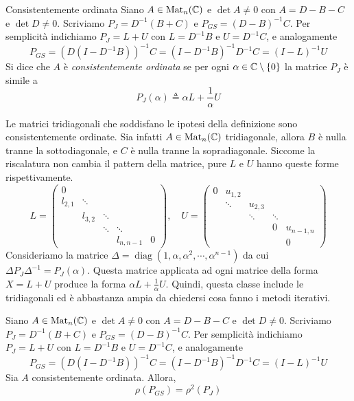 \documentclass[a4paper]{article}
\begin{document}
\begin{snippetdefinition}{Consistentemente ordinata}
    Siano \(A \in \operatorname{Mat}_n(\mathbb{C})\)
    e \(\det A \neq 0\)
    con \(A = D - B - C\) e \(\det D \neq 0\).
    Scriviamo \(P_J = D^{-1}(B + C)\)
    e \(P_{GS} = (D-B)^{-1}C\).
    Per semplicità indichiamo \(P_J = L+U\)
    con \(L = D^{-1}B\)
    e \(U = D^{-1}C\), e analogamente
    \[
        P_{GS} = (D(I-D^{-1}B))^{-1}C = (I - D^{-1} B)^{-1}D^{-1}C
        = (I-L)^{-1}U
    \]
    Si dice che \(A\) è \emph{consistentemente ordinata}
    se per ogni \(\alpha\in\mathbb{C}\setminus\{0\}\) la matrice \(P_J\)
    è simile a \[
        P_J(\alpha) \triangleq \alpha L + \frac{1}{\alpha}U
    \]
\end{snippetdefinition}

Le matrici tridiagonali che soddisfano le ipotesi della definizione sono
consistentemente ordinate. Sia infatti \(A \in \operatorname{Mat}_n(\mathbb{C})\)
tridiagonale, allora \(B\) è nulla tranne la sottodiagonale, e \(C\)
è nulla tranne la sopradiagonale. Siccome la riscalatura
non cambia il pattern della matrice, pure \(L\) e \(U\) hanno queste forme rispettivamente.
\[
    L =
    \begin{pmatrix}
        0 & & && \\
        l_{2,1} & \ddots & && \\
        & l_{3,2} & \ddots && \\
        & & \ddots & \ddots & \\
        & & & l_{n,n-1} & 0
    \end{pmatrix}, \quad
    U =
    \begin{pmatrix}
        0 & u_{1,2} & && \\
        & \ddots & u_{2,3} && \\
        & &  \ddots & \ddots & \\
        & & & 0 & u_{n-1,n} \\
        & & & & 0
    \end{pmatrix}
\]
Consideriamo la matrice \(\Delta = \operatorname{diag}(1, \alpha, \alpha^2, \cdots, \alpha^{n-1})\)
da cui \(\Delta P_J \Delta^{-1} = P_J(\alpha)\).
Questa matrice applicata ad ogni matrice della forma \(X = L + U\)
produce la forma \(\alpha L + \frac{1}{\alpha}U\).
Quindi, questa classe include le tridiagonali ed è abbastanza ampia da chiedersi
cosa fanno i metodi iterativi.

\begin{snippettheorem}{}
    Siano \(A \in \operatorname{Mat}_n(\mathbb{C})\)
    e \(\det A \neq 0\)
    con \(A = D - B - C\) e \(\det D \neq 0\).
    Scriviamo \(P_J = D^{-1}(B + C)\)
    e \(P_{GS} = (D-B)^{-1}C\).
    Per semplicità indichiamo \(P_J = L+U\)
    con \(L = D^{-1}B\)
    e \(U = D^{-1}C\), e analogamente
    \[
        P_{GS} = (D(I-D^{-1}B))^{-1}C = (I - D^{-1} B)^{-1}D^{-1}C
        = (I-L)^{-1}U
    \]
    Sia \(A\) consistentemente ordinata.
    Allora, \[
        \rho\left(P_{GS}\right)
        = \rho^2(P_J)
    \]
\end{snippettheorem}
\end{document}

